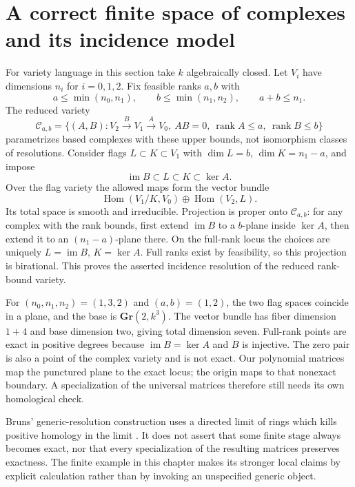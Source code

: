 \section{A correct finite space of complexes and its incidence model}
For variety language in this section take $k$ algebraically closed.
Let $V_i$ have dimensions $n_i$ for $i=0,1,2$. Fix feasible ranks
$a,b$ with
\[
 a\le\min(n_0,n_1),\qquad b\le\min(n_1,n_2),\qquad a+b\le n_1.
\]
The reduced variety
\[
 \mathcal C_{a,b}=\{(A,B):V_2\xrightarrow B V_1\xrightarrow A V_0,
       \ AB=0,\ \operatorname{rank}A\le a,\ \operatorname{rank}B\le b\}
\]
parametrizes based complexes with these upper bounds, not isomorphism
classes of resolutions. Consider flags
$L\subset K\subset V_1$ with $\dim L=b$, $\dim K=n_1-a$, and impose
\[
 \operatorname{im}B\subset L\subset K\subset\ker A.
\]
Over the flag variety the allowed maps form the vector bundle
\[
 \operatorname{Hom}(V_1/K,V_0)\oplus\operatorname{Hom}(V_2,L).
\]
Its total space is smooth and irreducible. Projection is proper onto
$\mathcal C_{a,b}$: for any complex with the rank bounds, first extend
$\operatorname{im}B$ to a $b$-plane inside $\ker A$, then extend it to an
$(n_1-a)$-plane there. On the full-rank locus the choices are uniquely
$L=\operatorname{im}B$, $K=\ker A$. Full ranks exist by feasibility,
so this projection is birational. This proves the asserted incidence
resolution of the reduced rank-bound variety.

For $(n_0,n_1,n_2)=(1,3,2)$ and $(a,b)=(1,2)$, the two flag spaces
coincide in a plane, and the base is $\mathbf{Gr}(2,k^3)$. The vector
bundle has fiber dimension $1+4$ and base dimension two, giving total
dimension seven. Full-rank points are exact in positive degrees because
$\operatorname{im}B=\ker A$ and $B$ is injective. The zero pair is also a
point of the complex variety and is not exact. Our polynomial matrices
map the punctured plane to the exact locus; the origin maps to that
nonexact boundary. A specialization of the universal matrices therefore
still needs its own homological check.

Bruns' generic-resolution construction uses a directed limit of rings
which kills positive homology in the limit \cite[Theorem 1, pp.35--36]{PersBruns}.
It does not assert that some finite stage always becomes exact, nor
that every specialization of the resulting matrices preserves exactness.
The finite example in this chapter makes its stronger local claims by
explicit calculation rather than by invoking an unspecified generic object.

